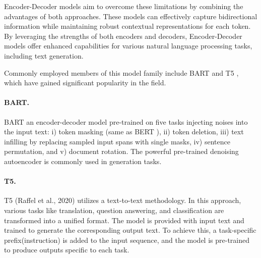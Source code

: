 Encoder-Decoder models aim to overcome these limitations by combining the advantages of both approaches. These models can effectively capture bidirectional information while maintaining robust contextual representations for each token. By leveraging the strengths of both encoders and decoders, Encoder-Decoder models offer enhanced capabilities for various natural language processing tasks, including text generation.

Commonly employed members of this model family include BART \cite{lewis-etal-2020-bart} and T5 \cite{raffel2020exploring}, which have gained significant popularity in the field.

\paragraph{BART.} BART \cite{lewis-etal-2020-bart} an encoder-decoder model pre-trained on five tasks injecting noises into the input text: i) token masking (same as BERT \cite{devlin2018bert}), ii) token deletion, iii) text infilling by replacing sampled input spans with single masks, iv) sentence permutation, and v) document rotation. The powerful pre-trained denoising autoencoder is commonly used in generation tasks.

\paragraph{T5.} T5 (Raffel et al., 2020) utilizes a text-to-text methodology. In this approach, various tasks like translation, question answering, and classification are transformed into a unified format. The model is provided with input text and trained to generate the corresponding output text. To achieve this, a task-specific prefix(instruction) is added to the input sequence, and the model is pre-trained to produce outputs specific to each task.\\



